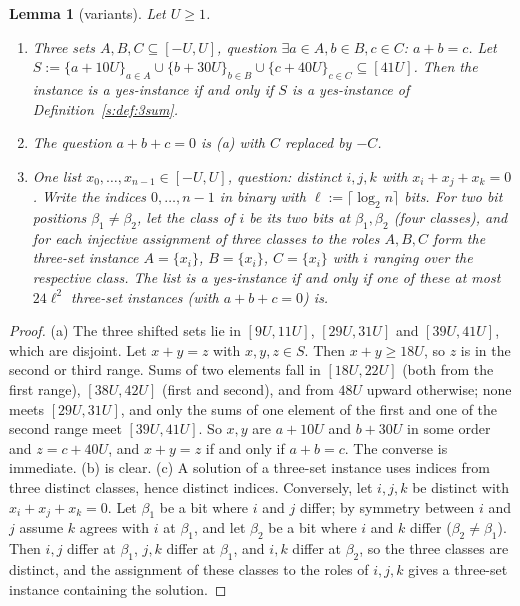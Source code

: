 \documentclass[11pt]{article}
\newtheorem{lemma}[theorem]{Lemma}
\theoremstyle{definition}
\theoremstyle{remark}
\begin{document}
\begin{lemma}[variants]\label{s:lem:variants}
Let $U\ge1$.
\begin{enumerate}[label=(\alph*)]
\item Three sets $A,B,C\subseteq[-U,U]$, question $\exists a\in A,b\in B,c\in C$: $a+b=c$. Let $S:=\{a+10U\}_{a\in A}\cup\{b+30U\}_{b\in B}\cup\{c+40U\}_{c\in C}\subseteq[41U]$. Then the instance is a yes-instance if and only if $S$ is a yes-instance of Definition~\ref{s:def:3sum}.
\item The question $a+b+c=0$ is (a) with $C$ replaced by $-C$.
\item One list $x_0,\dots,x_{n-1}\in[-U,U]$, question: distinct $i,j,k$ with $x_i+x_j+x_k=0$. Write the indices $0,\dots,n-1$ in binary with $\ell:=\lceil\log_2 n\rceil$ bits. For two bit positions $\beta_1\ne\beta_2$, let the class of $i$ be its two bits at $\beta_1,\beta_2$ (four classes), and for each injective assignment of three classes to the roles $A,B,C$ form the three-set instance $A=\{x_i\}$, $B=\{x_i\}$, $C=\{x_i\}$ with $i$ ranging over the respective class. The list is a yes-instance if and only if one of these at most $24\ell^2$ three-set instances (with $a+b+c=0$) is.
\end{enumerate}
\end{lemma}
\begin{proof}
(a) The three shifted sets lie in $[9U,11U]$, $[29U,31U]$ and $[39U,41U]$, which are disjoint. Let $x+y=z$ with $x,y,z\in S$. Then $x+y\ge18U$, so $z$ is in the second or third range. Sums of two elements fall in $[18U,22U]$ (both from the first range), $[38U,42U]$ (first and second), and from $48U$ upward otherwise; none meets $[29U,31U]$, and only the sums of one element of the first and one of the second range meet $[39U,41U]$. So $x,y$ are $a+10U$ and $b+30U$ in some order and $z=c+40U$, and $x+y=z$ if and only if $a+b=c$. The converse is immediate.
(b) is clear. (c) A solution of a three-set instance uses indices from three distinct classes, hence distinct indices. Conversely, let $i,j,k$ be distinct with $x_i+x_j+x_k=0$. Let $\beta_1$ be a bit where $i$ and $j$ differ; by symmetry between $i$ and $j$ assume $k$ agrees with $i$ at $\beta_1$, and let $\beta_2$ be a bit where $i$ and $k$ differ ($\beta_2\ne\beta_1$). Then $i,j$ differ at $\beta_1$, $j,k$ differ at $\beta_1$, and $i,k$ differ at $\beta_2$, so the three classes are distinct, and the assignment of these classes to the roles of $i,j,k$ gives a three-set instance containing the solution.
\end{proof}
\end{document}
